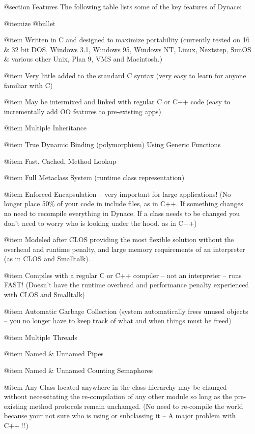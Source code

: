 @section Features
The following table lists some of the key features of Dynace:

@itemize @bullet

@item Written in C and designed to maximize portability (currently tested
on 16 & 32 bit DOS, Windows 3.1, Windows 95, Windows NT, Linux, Nextstep,
SunOS & various other Unix, Plan 9, VMS and Macintosh.)

@item Very little added to the standard C syntax (very easy to learn for
anyone familiar with C)

@item May be intermixed and linked with regular C or C++ code (easy to
incrementally add OO features to pre-existing apps)

@item Multiple Inheritance

@item True Dynamic Binding (polymorphism) Using Generic Functions

@item Fast, Cached, Method Lookup

@item Full Metaclass System (runtime class representation)

@item Enforced Encapsulation -- very important for large 
applications!  (No longer place 50\% of your code in include files, as
in C++. If something changes no need to recompile everything in
Dynace.  If a class needs to be changed you don't need to worry who is
looking under the hood, as in C++)

@item Modeled after CLOS providing the most flexible
solution without the overhead and runtime penalty, and large memory
requirements of an interpreter (as in CLOS and Smalltalk).

@item Compiles with a regular C or C++ compiler -- not an interpreter -- 
runs FAST!  (Doesn't have the runtime overhead and performance penalty
experienced with CLOS and Smalltalk)

@item Automatic Garbage Collection (system automatically frees unused
objects -- you no longer have to keep track of what and when things
must be freed)

@item Multiple Threads

@item Named & Unnamed Pipes

@item Named & Unnamed Counting Semaphores

@item Any Class located anywhere in the class hierarchy may be changed without
necessitating the re-compilation of any other module so long as the
pre-existing method protocols remain unchanged. (No need to re-compile
the world because your not sure who is using or subclassing it -- A
major problem with C++ !!)

